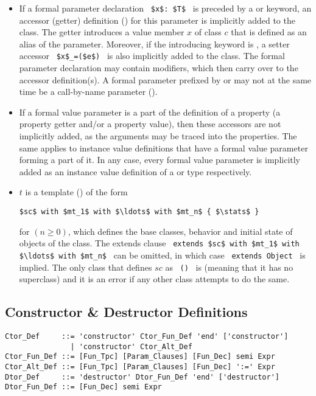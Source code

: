 \begin{itemize}
\item[]
If a formal parameter declaration ~\lstinline!$x$: $T$!~ is preceded by a  or  keyword, an accessor (getter) definition () for this parameter is implicitly added to the class. The getter introduces a value member $x$ of class $c$ that is defined as an alias of the parameter. Moreover, if the introducing keyword is , a setter accessor ~\lstinline!$x$_=($e$)!~ is also implicitly added to the class. The formal parameter declaration may contain modifiers, which then carry over to the accessor definition(s). A formal parameter prefixed by  or  may not at the same time be a call-by-name parameter (). 

\item[]
If a formal value parameter is a part of the definition of a property (a property getter and/or a property value), then these accessors are not implicitly added, as the arguments may be traced into the properties. The same applies to instance value definitions that have a formal value parameter forming a part of it. In any case, every formal value parameter is implicitly added as an instance value definition of  a  or  type respectively. 

\item[]
$t$ is a template () of the form
\begin{lstlisting}
$sc$ with $mt_1$ with $\ldots$ with $mt_n$ { $\stats$ }
\end{lstlisting}
for $(n \geq 0)$, which defines the base classes, behavior and initial state of objects of the class. The extends clause ~\lstinline!extends $sc$ with $mt_1$ with $\ldots$ with $mt_n$!~ can be omitted, in which case ~\lstinline!extends Object!~ is implied. The only class that defines $sc$ as ~\lstinline!()!~ is  (meaning that it has no superclass) and it is an error if any other class attempts to do the same. 

\end{itemize}

\subsection{Constructor \& Destructor Definitions}
\label{sec:constructor-destructor-def}

\syntax\begin{lstlisting}
Ctor_Def     ::= 'constructor' Ctor_Fun_Def 'end' ['constructor']
               | 'constructor' Ctor_Alt_Def
Ctor_Fun_Def ::= [Fun_Tpc] [Param_Clauses] [Fun_Dec] semi Expr
Ctor_Alt_Def ::= [Fun_Tpc] [Param_Clauses] [Fun_Dec] ':=' Expr
Dtor_Def     ::= 'destructor' Dtor_Fun_Def 'end' ['destructor']
Dtor_Fun_Def ::= [Fun_Dec] semi Expr
\end{lstlisting}

